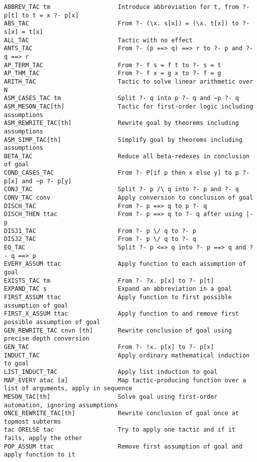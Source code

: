 \documentclass{llncs}
\begin{document}
\begingroup
\scriptsize
\begin{verbatim}
ABBREV_TAC tm                   Introduce abbreviation for t, from ?- p[t] to t = x ?- p[x]
ABS_TAC                         From ?- (\x. s[x]) = (\x. t[x]) to ?- s[x] = t[x]
ALL_TAC                         Tactic with no effect
ANTS_TAC                        From ?- (p ==> q) ==> r to ?- p and ?- q ==> r
AP_TERM_TAC                     From ?- f s = f t to ?- s = t
AP_THM_TAC                      From ?- f x = g x to ?- f = g
ARITH_TAC                       Tactic to solve linear arithmetic over N
ASM_CASES_TAC tm                Split ?- q into p ?- q and ~p ?- q
ASM_MESON_TAC[th]               Tactic for first-order logic including assumptions
ASM_REWRITE_TAC[th]             Rewrite goal by theorems including assumptions
ASM_SIMP_TAC[th]                Simplify goal by theorems including assumptions
BETA_TAC                        Reduce all beta-redexes in conclusion of goal
COND_CASES_TAC                  From ?- P[if p then x else y] to p ?- p[x] and ~p ?- p[y]
CONJ_TAC                        Split ?- p /\ q into ?- p and ?- q
CONV_TAC conv                   Apply conversion to conclusion of goal
DISCH_TAC                       From ?- p ==> q to p ?- q
DISCH_THEN ttac                 From ?- p ==> q to ?- q after using |- p
DISJ1_TAC                       From ?- p \/ q to ?- p
DISJ2_TAC                       From ?- p \/ q to ?- q
EQ_TAC                          Split ?- p <=> q into ?- p ==> q and ?- q ==> p
EVERY_ASSUM ttac                Apply function to each assumption of goal
EXISTS_TAC tm                   From ?- ?x. p[x] to ?- p[t]
EXPAND_TAC s                    Expand an abbreviation in a goal
FIRST_ASSUM ttac                Apply function to first possible assumption of goal
FIRST_X_ASSUM ttac              Apply function to and remove first possible assumption of goal
GEN_REWRITE_TAC cnvn [th]       Rewrite conclusion of goal using precise depth conversion
GEN_TAC                         From ?- !x. p[x] to ?- p[x]
INDUCT_TAC                      Apply ordinary mathematical induction to goal
LIST_INDUCT_TAC                 Apply list induction to goal
MAP_EVERY atac [a]              Map tactic-producing function over a list of arguments, apply in sequence
MESON_TAC[th]                   Solve goal using first-order automation, ignoring assumptions
ONCE_REWRITE_TAC[th]            Rewrite conclusion of goal once at topmost subterms
tac ORELSE tac                  Try to apply one tactic and if it fails, apply the other
POP_ASSUM ttac                  Remove first assumption of goal and apply function to it

\end{verbatim}
\end{document}
